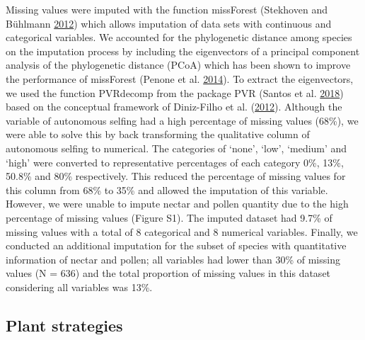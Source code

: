 \documentclass[11pt,a4paper,]{article}
\begin{document}
Missing values were imputed with the function missForest (Stekhoven and
Bühlmann \protect\hyperlink{ref-stekhoven2012}{2012}) which allows
imputation of data sets with continuous and categorical variables. We
accounted for the phylogenetic distance among species on the imputation
process by including the eigenvectors of a principal component analysis
of the phylogenetic distance (PCoA) which has been shown to improve the
performance of missForest (Penone et al.
\protect\hyperlink{ref-penone2014}{2014}). To extract the eigenvectors,
we used the function PVRdecomp from the package PVR (Santos et al.
\protect\hyperlink{ref-santos2018}{2018}) based on the conceptual
framework of Diniz-Filho et al.
(\protect\hyperlink{ref-diniz-filho2012}{2012}). Although the variable
of autonomous selfing had a high percentage of missing values (68\%), we
were able to solve this by back transforming the qualitative column of
autonomous selfing to numerical. The categories of `none', `low',
`medium' and `high' were converted to representative percentages of each
category 0\%, 13\%, 50.8\% and 80\% respectively. This reduced the
percentage of missing values for this column from 68\% to 35\% and
allowed the imputation of this variable. However, we were unable to
impute nectar and pollen quantity due to the high percentage of missing
values (Figure S1). The imputed dataset had 9.7\% of missing values with
a total of 8 categorical and 8 numerical variables. Finally, we
conducted an additional imputation for the subset of species with
quantitative information of nectar and pollen; all variables had lower
than 30\% of missing values (N = 636) and the total proportion of
missing values in this dataset considering all variables was 13\%.

\subsection{Plant strategies}\label{plant-strategies}
\end{document}
